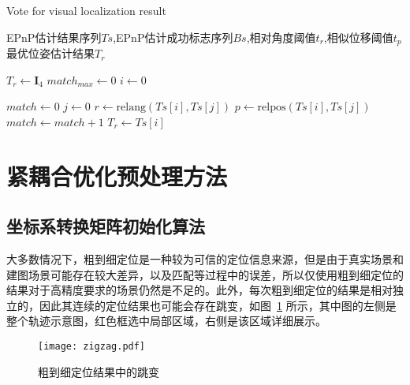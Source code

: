 \renewcommand{\algorithmicrequire}{\textbf{输入：}\unskip}
\renewcommand{\algorithmicensure}{\textbf{输出：}\unskip}
\begin{algorithm}
  \caption{Vote for visual localization result}
  \label{alg2}
  \small
  \begin{algorithmic}[1]
    \REQUIRE EPnP估计结果序列$Ts$,EPnP估计成功标志序列$Bs$,相对角度阈值$t_r$,相似位移阈值$t_p$
    \ENSURE 最优位姿估计结果$T_{r}$

    \STATE $T_{r} \leftarrow \symbf{I}_4$
    \STATE ${match}_{max} \leftarrow 0$
    \STATE $i \leftarrow 0$

      \STATE $match \leftarrow 0$
        \STATE $j \leftarrow 0$
          \STATE $r \leftarrow \text{relang}(Ts[i], Ts[j])$
          \STATE $p \leftarrow \text{relpos}(Ts[i], Ts[j])$
            \STATE $match \leftarrow match + 1$
          \ENDIF
        \ENDWHILE
          \STATE $T_{r} \leftarrow Ts[i]$
        \ENDIF
      \ENDIF
    \ENDWHILE
  \end{algorithmic}
\end{algorithm}

\section{紧耦合优化预处理方法}
\subsection{坐标系转换矩阵初始化算法}

大多数情况下，粗到细定位是一种较为可信的定位信息来源，但是由于真实场景和建图场景可能存在较大差异，以及匹配等过程中的误差，所以仅使用粗到细定位的结果对于高精度要求的场景仍然是不足的。此外，每次粗到细定位的结果是相对独立的，因此其连续的定位结果也可能会存在跳变，如图~\ref{fig:zigzag} 所示，其中图的左侧是整个轨迹示意图，红色框选中局部区域，右侧是该区域详细展示。

\begin{figure}
  \centering
  \texttt{[image: zigzag.pdf]}
  \caption{粗到细定位结果中的跳变}
  \label{fig:zigzag}
\end{figure}

